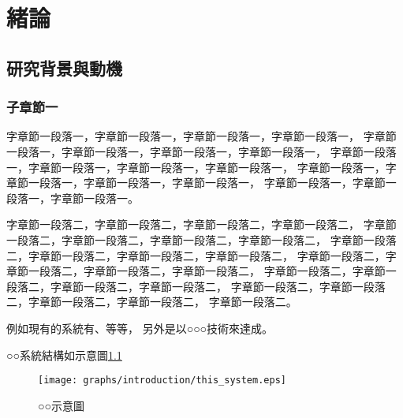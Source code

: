 \chapter{緒論}
\label{chapter:intro}
\section{研究背景與動機}
\label{sec:background}
    \subsection{子章節一}
        字章節一段落一，字章節一段落一，字章節一段落一，字章節一段落一，
        字章節一段落一，字章節一段落一，字章節一段落一，字章節一段落一，
        字章節一段落一，字章節一段落一，字章節一段落一，字章節一段落一，
        字章節一段落一，字章節一段落一，字章節一段落一，字章節一段落一，
        字章節一段落一，字章節一段落一，字章節一段落一。

        字章節一段落二，字章節一段落二，字章節一段落二，字章節一段落二，
        字章節一段落二，字章節一段落二，字章節一段落二，字章節一段落二，
        字章節一段落二，字章節一段落二，字章節一段落二，字章節一段落二，
        字章節一段落二，字章節一段落二，字章節一段落二，字章節一段落二，
        字章節一段落二，字章節一段落二，字章節一段落二，字章節一段落二，
        字章節一段落二，字章節一段落二，字章節一段落二，字章節一段落二，
        字章節一段落二。

        例如現有的系統有\cite{GoogleComputeEngine}、\cite{AmazonEC2}等等，
        另外\cite{GoogleApps}是以○○○技術來達成。

        ○○系統結構如示意圖\ref{fig:this_system}
        \begin{figure}[htbp]
            \centerline{\texttt{[image: graphs/introduction/this\_system.eps]}}
            \caption{○○示意圖}
            \label{fig:this_system}
        \end{figure}

